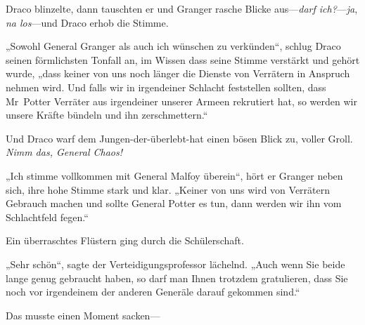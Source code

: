 Draco blinzelte, dann tauschten er und Granger rasche Blicke aus—\emph{darf ich?}—\emph{ja}, \emph{na los}—und Draco erhob die Stimme.

„Sowohl General Granger als auch ich wünschen zu verkünden“, schlug Draco seinen förmlichsten Tonfall an, im Wissen dass seine Stimme verstärkt und gehört wurde, „dass keiner von uns noch länger die Dienste von Verrätern in Anspruch nehmen wird. Und falls wir in irgendeiner Schlacht feststellen sollten, dass Mr~Potter Verräter aus irgendeiner unserer Armeen rekrutiert hat, so werden wir unsere Kräfte bündeln und ihn zerschmettern.“

Und Draco warf dem Jungen-der-überlebt-hat einen bösen Blick zu, voller Groll. \emph{Nimm das, General Chaos!}

„Ich stimme vollkommen mit General Malfoy überein“, hört er Granger neben sich, ihre hohe Stimme stark und klar. „Keiner von uns wird von Verrätern Gebrauch machen und sollte General Potter es tun, dann werden wir ihn vom Schlachtfeld fegen.“

Ein überraschtes Flüstern ging durch die Schülerschaft.

„Sehr schön“, sagte der Verteidigungsprofessor lächelnd. „Auch wenn Sie beide lange genug gebraucht haben, so darf man Ihnen trotzdem gratulieren, dass Sie noch vor irgendeinem der anderen Generäle darauf gekommen sind.“

Das musste einen Moment sacken—


